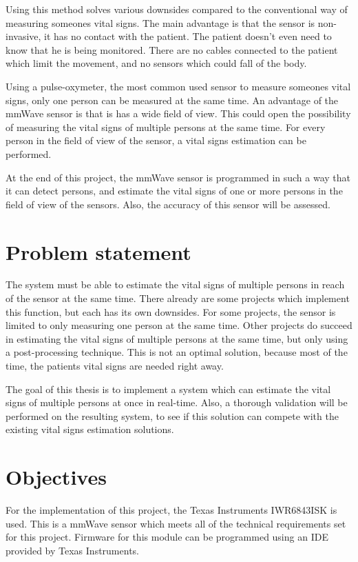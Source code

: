 Using this method solves various downsides compared to the conventional way of measuring someones vital signs. The main advantage is that the sensor is non-invasive, it has no contact with the patient. The patient doesn't even need to know that he is being monitored. There are no cables connected to the patient which limit the movement, and no sensors which could fall of the body. 

Using a pulse-oxymeter, the most common used sensor to measure someones vital signs, only one person can be measured at the same time. An advantage of the mmWave sensor is that is has a wide field of view. This could open the possibility of measuring the vital signs of multiple persons at the same time. For every person in the field of view of the sensor, a vital signs estimation can be performed.

At the end of this project, the mmWave sensor is programmed in such a way that it can detect persons, and estimate the vital signs of one or more persons in the field of view of the sensors. Also, the accuracy of this sensor will be assessed.

\section{Problem statement}
\label{sec:problem_statement}
The system must be able to estimate the vital signs of multiple persons in reach of the sensor at the same time. There already are some projects which implement this function, but each has its own downsides. For some projects, the sensor is limited to only measuring one person at the same time. Other projects do succeed in estimating the vital signs of multiple persons at the same time, but only using a post-processing technique. This is not an optimal solution, because most of the time, the patients vital signs are needed right away. 

The goal of this thesis is to implement a system which can estimate the vital signs of multiple persons at once in real-time. Also, a thorough validation will be performed on the resulting system, to see if this solution can compete with the existing vital signs estimation solutions.

\section{Objectives}
For the implementation of this project, the Texas Instruments IWR6843ISK is used. This is a mmWave sensor which meets all of the technical requirements set for this project. Firmware for this module can be programmed using an IDE provided by Texas Instruments.

